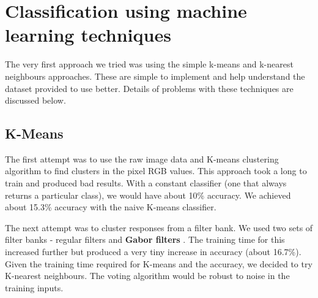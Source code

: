 \documentclass{article} %
\begin{document}
    
    

\section{Classification using machine learning techniques}
    The very first approach we tried was using the simple k-means and k-nearest neighbours approaches. These are simple to implement and help understand the dataset provided to use better. Details of problems with these techniques are discussed below.
\subsection{K-Means} %
The first attempt was to use the raw image data and K-means clustering algorithm to find clusters in the pixel RGB values. This approach took a long to train and produced bad results. With a constant classifier (one that always returns a particular class), we would have about 10\% accuracy. We achieved about 15.3\% accuracy with the naive K-means classifier. %

        The next attempt was to cluster responses from a filter bank. We used two sets of filter banks - regular filters and \textbf{Gabor filters} \cite{gabor}. The training time for this increased further but produced a very tiny increase in accuracy (about 16.7\%). Given the training time required for K-means and the accuracy, we decided to try K-nearest neighbours. The voting algorithm would be robust to noise in the training inputs.
\end{document}
